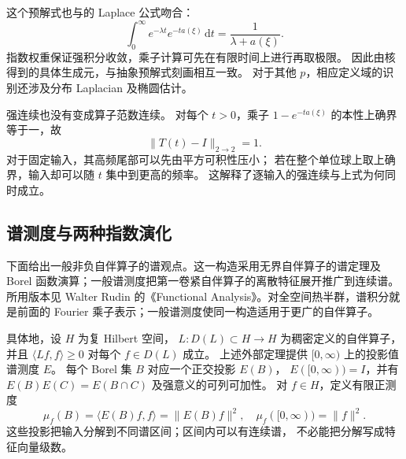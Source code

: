 这个预解式也与的 Laplace 公式吻合：
\[
 \int_0^\infty e^{-\lambda t}e^{-ta(\xi)}\,\mathrm dt
 =\frac1{\lambda+a(\xi)}.
\]
指数权重保证强积分收敛，乘子计算可先在有限时间上进行再取极限。
因此由核得到的具体生成元，与抽象预解式刻画相互一致。
对于其他 \(p\)，相应定义域的识别还涉及分布 Laplacian 及椭圆估计。

\ProseParagraphBreak
强连续也没有变成算子范数连续。
对每个 \(t>0\)，乘子 \(1-e^{-ta(\xi)}\) 的本性上确界等于一，故
\[
 \|T(t)-I\|_{2\to2}=1.
\]
对于固定输入，其高频尾部可以先由平方可积性压小；
若在整个单位球上取上确界，输入却可以随 \(t\) 集中到更高的频率。
这解释了逐输入的强连续与上式为何同时成立。

\subsection{谱测度与两种指数演化}
\label{b2:subsec:D-spectral-calculus}

下面给出一般非负自伴算子的谱观点。这一构造采用无界自伴算子的谱定理及 Borel 函数演算；一般谱测度把第一卷紧自伴算子的离散特征展开推广到连续谱。所用版本见 Walter Rudin 的《Functional Analysis》\cite[13.24 Theorem, pp. 362--364; 13.30 Theorem, pp. 368--369; 13.31 Theorem(a), p. 369]{Rudin1991Functional}。对全空间热半群，谱积分就是前面的 Fourier 乘子表示；一般谱测度使同一构造适用于更广的自伴算子。

具体地，设 \(H\) 为复 Hilbert 空间，
\(L:D(L)\subset H\to H\) 为稠密定义的自伴算子，
并且 \(\langle Lf,f\rangle\ge0\) 对每个 \(f\in D(L)\) 成立。
上述外部定理提供 \([0,\infty)\) 上的投影值谱测度 \(E\)。
每个 Borel 集 \(B\) 对应一个正交投影 \(E(B)\)，
\(E([0,\infty))=I\)，并有
\(E(B)E(C)=E(B\cap C)\) 及强意义的可列可加性。
对 \(f\in H\)，定义有限正测度
\[
 \mu_f(B)=\langle E(B)f,f\rangle=\|E(B)f\|^2,
 \quad \mu_f([0,\infty))=\|f\|^2.
\]
这些投影把输入分解到不同谱区间；区间内可以有连续谱，
不必能把分解写成特征向量级数。

